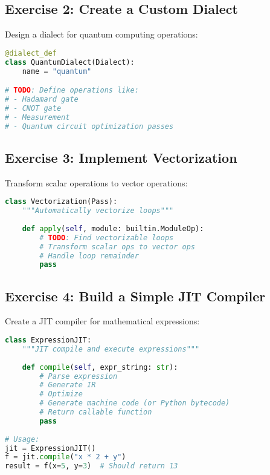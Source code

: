 \documentclass[11pt,a4paper]{article}
\begin{document}
\subsection{Exercise 2: Create a Custom Dialect}

Design a dialect for quantum computing operations:

\begin{lstlisting}[language=Python, caption=Exercise: Quantum Dialect]
@dialect_def
class QuantumDialect(Dialect):
    name = "quantum"

# TODO: Define operations like:
# - Hadamard gate
# - CNOT gate  
# - Measurement
# - Quantum circuit optimization passes
\end{lstlisting}

\subsection{Exercise 3: Implement Vectorization}

Transform scalar operations to vector operations:

\begin{lstlisting}[language=Python, caption=Exercise: Auto-Vectorization]
class Vectorization(Pass):
    """Automatically vectorize loops"""
    
    def apply(self, module: builtin.ModuleOp):
        # TODO: Find vectorizable loops
        # Transform scalar ops to vector ops
        # Handle loop remainder
        pass
\end{lstlisting}

\subsection{Exercise 4: Build a Simple JIT Compiler}

Create a JIT compiler for mathematical expressions:

\begin{lstlisting}[language=Python, caption=Exercise: JIT Compiler]
class ExpressionJIT:
    """JIT compile and execute expressions"""
    
    def compile(self, expr_string: str):
        # Parse expression
        # Generate IR
        # Optimize
        # Generate machine code (or Python bytecode)
        # Return callable function
        pass
    
# Usage:
jit = ExpressionJIT()
f = jit.compile("x * 2 + y")
result = f(x=5, y=3)  # Should return 13
\end{lstlisting}
\end{document}
